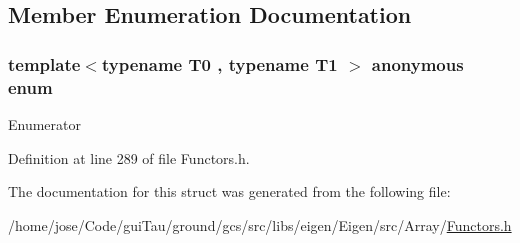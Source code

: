 \subsection{Member Enumeration Documentation}
\hypertarget{structei__functor__traits_3_01std_1_1project2nd_3_01_t0_00_01_t1_01_4_01_4_a859f3fc2b6203356ea0895ca3a29d58b}{\subsubsection[{anonymous enum}]{\setlength{\rightskip}{0pt plus 5cm}template$<$typename T0 , typename T1 $>$ anonymous enum}}\label{structei__functor__traits_3_01std_1_1project2nd_3_01_t0_00_01_t1_01_4_01_4_a859f3fc2b6203356ea0895ca3a29d58b}
\begin{Desc}
\item[Enumerator]\par
\begin{description}
\item[{\em 
\hypertarget{structei__functor__traits_3_01std_1_1project2nd_3_01_t0_00_01_t1_01_4_01_4_a859f3fc2b6203356ea0895ca3a29d58ba03fc0dab7552e2c15b3e26d511fc456c}{Cost}\label{structei__functor__traits_3_01std_1_1project2nd_3_01_t0_00_01_t1_01_4_01_4_a859f3fc2b6203356ea0895ca3a29d58ba03fc0dab7552e2c15b3e26d511fc456c}
}]\item[{\em 
\hypertarget{structei__functor__traits_3_01std_1_1project2nd_3_01_t0_00_01_t1_01_4_01_4_a859f3fc2b6203356ea0895ca3a29d58ba3fcc9c861a5771ad71ae45fd61e422ae}{Packet\-Access}\label{structei__functor__traits_3_01std_1_1project2nd_3_01_t0_00_01_t1_01_4_01_4_a859f3fc2b6203356ea0895ca3a29d58ba3fcc9c861a5771ad71ae45fd61e422ae}
}]\end{description}
\end{Desc}


Definition at line 289 of file Functors.\-h.



The documentation for this struct was generated from the following file\-:\begin{DoxyCompactItemize}
\item 
/home/jose/\-Code/gui\-Tau/ground/gcs/src/libs/eigen/\-Eigen/src/\-Array/\hyperlink{_array_2_functors_8h}{Functors.\-h}\end{DoxyCompactItemize}
